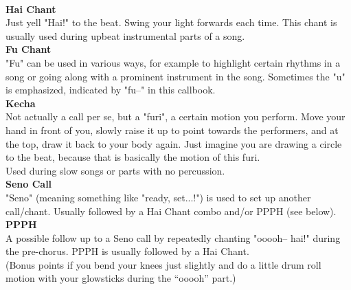 \vfill

\newpage
\vspace*{0.5em}
\textbf{\large {}}\\

\textbf{Hai Chant}\\
Just yell "Hai!" to the beat. Swing your light forwards each time. This chant is usually used during upbeat instrumental parts of a song.\\

\textbf{Fu Chant}\\
"Fu" can be used in various ways, for example to highlight certain rhythms in a song or going along with a prominent instrument in the song. Sometimes the "u" is emphasized, indicated by "fu--" in this callbook.\\

\textbf{Kecha}\\
Not actually a call per se, but a "furi", a certain motion you perform.
Move your hand in front of you, slowly raise it up to point towards the performers, and at the top, draw it back to your body again. Just imagine you are drawing a circle to the beat, because that is basically the motion of this furi.\\
Used during slow songs or parts with no percussion.
\vfill
\textbf{\large {}}\\

\textbf{Seno Call}\\
"Seno" (meaning something like "ready, set...!") is used to set up another call/chant. Usually followed by a Hai Chant combo and/or PPPH (see below).\\

\textbf{PPPH}\\
A possible follow up to a Seno call by repeatedly chanting "ooooh-- hai!" during the pre-chorus. PPPH is usually followed by a Hai Chant.\\
(Bonus points if you bend your knees just slightly and do a little drum roll motion with your glowsticks during the “ooooh” part.)\\

\vfill

\ifdefined\COMPLETE
\else
	
\fi